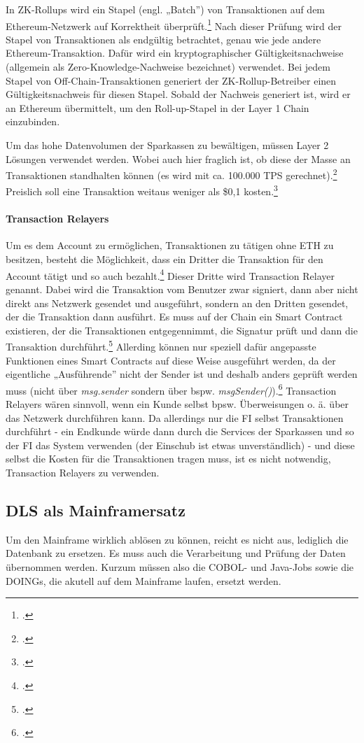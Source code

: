 \documentclass[12pt, a4paper]{article}
\begin{document}
{\begin{itemize}
    \noindent
    In ZK-Rollups wird ein Stapel (engl. „Batch”) von Transaktionen auf dem Ethereum-Netzwerk auf Korrektheit überprüft.\footcite[Vgl. hierzu und zum Folgenden sowie weiterführend][]{w23}
    Nach dieser Prüfung wird der Stapel von Transaktionen als endgültig betrachtet, genau wie jede andere Ethereum-Transaktion. Dafür wird ein kryptographischer Gültigkeitsnachweise (allgemein als Zero-Knowledge-Nachweise bezeichnet) verwendet. 
    Bei jedem Stapel von Off-Chain-Transaktionen generiert der ZK-Rollup-Betreiber einen Gültigkeitsnachweis für diesen Stapel. Sobald der Nachweis generiert ist, wird er an Ethereum übermittelt, um den Roll-up-Stapel in der Layer 1 Chain einzubinden.
\end{itemize}
\bigbreak
\noindent
Um das hohe Datenvolumen der Sparkassen zu bewältigen, müssen Layer 2 Lösungen verwendet werden. 
Wobei auch hier fraglich ist, ob diese der Masse an Transaktionen standhalten können (es wird mit ca. 100.000 TPS gerechnet).\footcite[Vgl.][]{w34}
Preislich soll eine Transaktion weitaus weniger als \$0,1 kosten.\footcite[Vgl.][]{w37}


\paragraph{Transaction Relayers}
\label{sec:definition-transaction-relayers}
Um es dem Account zu ermöglichen, Transaktionen zu tätigen ohne ETH zu besitzen, besteht die Möglichkeit, dass ein Dritter die Transaktion für den Account tätigt und so auch bezahlt.\footcites[Vgl. hierzu und zum Folgenden sowie weiterführend][]{w24}[]{w26}
Dieser Dritte wird Transaction Relayer genannt.
Dabei wird die Transaktion vom Benutzer zwar signiert, dann aber nicht direkt ans Netzwerk gesendet und ausgeführt, sondern an den Dritten gesendet, der die Transaktion dann ausführt.
Es muss auf der Chain ein Smart Contract existieren, der die Transaktionen entgegennimmt, die Signatur prüft und dann die Transaktion durchführt.\footcite[Vgl.][]{w25}
Allerding können nur speziell dafür angepasste Funktionen eines Smart Contracts auf diese Weise ausgeführt werden, da der eigentliche „Ausführende” nicht der Sender ist und deshalb anders geprüft werden muss (nicht über \textit{msg.sender} sondern über bspw. \textit{msgSender()}).\footcites[Vgl.][]{w27}[]{w24}
\bigbreak
\noindent
Transaction Relayers wären sinnvoll, wenn ein Kunde selbst bpsw. Überweisungen o. ä. über das Netzwerk durchführen kann.
Da allerdings nur die FI selbst Transaktionen durchführt - ein Endkunde würde dann durch die Services der Sparkassen und so der FI das System verwenden (der Einschub ist etwas unverständlich) - und diese selbst die Kosten für die Transaktionen tragen muss, ist es nicht notwendig, Transaction Relayers zu verwenden.\subsection{DLS als Mainframersatz}
Um den Mainframe wirklich ablösen zu können, reicht es nicht aus, lediglich die Datenbank zu ersetzen. 
Es muss auch die Verarbeitung und Prüfung der Daten übernommen werden.
Kurzum müssen also die COBOL- und Java-Jobs sowie die DOINGs, die akutell auf dem Mainframe laufen, ersetzt werden.

}
\end{document}
